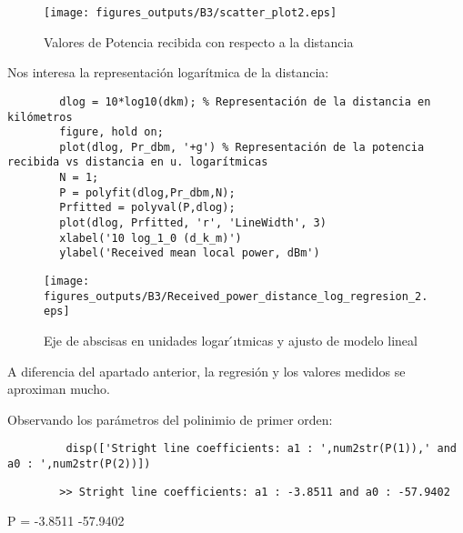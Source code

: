 \documentclass{article}
\begin{document}
    \begin{figure}[h]
        \centering
        \texttt{[image: figures\_outputs/B3/scatter\_plot2.eps]}
        \caption{Valores de Potencia recibida con respecto a la distancia}
        \label{fig:my_label}
    \end{figure}
    \par Nos interesa la representación logarítmica de la distancia:
    \begin{lstlisting}
        dlog = 10*log10(dkm); % Representación de la distancia en kilómetros
        figure, hold on; 
        plot(dlog, Pr_dbm, '+g') % Representación de la potencia recibida vs distancia en u. logarítmicas
        N = 1;
        P = polyfit(dlog,Pr_dbm,N);
        Prfitted = polyval(P,dlog);
        plot(dlog, Prfitted, 'r', 'LineWidth', 3)
        xlabel('10 log_1_0 (d_k_m)')
        ylabel('Received mean local power, dBm')
    \end{lstlisting}
    \clearpage
    \begin{figure}[h]
        \centering
        \texttt{[image: figures\_outputs/B3/Received\_power\_distance\_log\_regresion\_2.eps]}
        \caption{Eje de abscisas en unidades logar ́ıtmicas y ajusto de modelo lineal}
        \label{fig:my_label}
    \end{figure}
    \par A diferencia del apartado anterior, la regresión y los valores medidos se aproximan mucho.
    \par Observando los parámetros del polinimio de primer orden:
    \begin{lstlisting}
         disp(['Stright line coefficients: a1 : ',num2str(P(1)),' and a0 : ',num2str(P(2))])
    \end{lstlisting}
    \begin{verbatim}
        >> Stright line coefficients: a1 : -3.8511 and a0 : -57.9402
    \end{verbatim}
    \par \color{blue} \centering P = -3.8511 \hspace{0.1cm }-57.9402
    \par \justify \color{black}
    \clearpage
\end{document}
